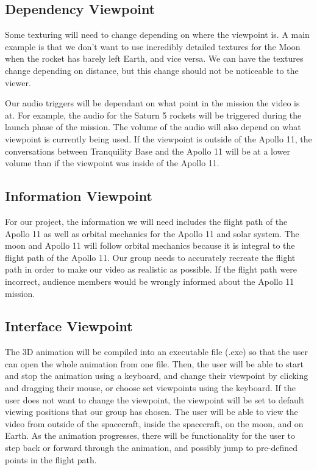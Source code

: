 \documentclass[onecolumn, draftclsnofoot,10pt, compsoc]{IEEEtran}
\begin{document}
    \subsection{Dependency Viewpoint}

    Some texturing will need to change depending on where the viewpoint is. A main example is that we don't want to use incredibly detailed textures for the Moon when the rocket has barely left Earth, and vice versa. We can have the textures change depending on distance, but this change should not be noticeable to the viewer.
    
    Our audio triggers will be dependant on what point in the mission the video is at. For example, the audio for the Saturn 5 rockets will be triggered during the launch phase of the mission. The volume of the audio will also depend on what viewpoint is currently being used. If the viewpoint is outside of the Apollo 11, the conversations between Tranquility Base and the Apollo 11 will be at a lower volume than if the viewpoint was inside of the Apollo 11.
    
    \subsection{Information Viewpoint}
    For our project, the information we will need includes the flight path of the Apollo 11 as well as orbital mechanics for the Apollo 11 and solar system. The moon and Apollo 11 will follow orbital mechanics because it is integral to the flight path of the Apollo 11. Our group needs to accurately recreate the flight path in order to make our video as realistic as possible. If the flight path were incorrect, audience members would be wrongly informed about the Apollo 11 mission.

    \subsection{Interface Viewpoint}
       
       The 3D animation will be compiled into an executable file (.exe) so that the user can open the whole animation from one file. Then, the user will be able to start and stop the animation using a keyboard, and change their viewpoint by clicking and dragging their mouse, or choose set viewpoints using the keyboard. If the user does not want to change the viewpoint, the viewpoint will be set to default viewing positions that our group has chosen. The user will be able to view the video from outside of the spacecraft, inside the spacecraft, on the moon, and on Earth. As the animation progresses, there will be functionality for the user to step back or forward through the animation, and possibly jump to pre-defined points in the flight path.
    
\end{document}
